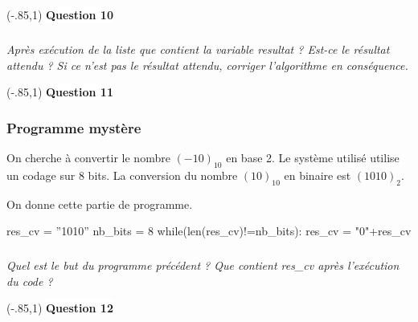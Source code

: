 \documentclass[10pt]{article}
\begin{document}
\vspace{.3cm}
\noindent\boxput*(-.85,1){
\colorbox{white}{\textbf{Question 10}}}{
\setlength{\fboxsep}{10pt}
}


\newpage

\subparagraph{}\textit{Après exécution de la liste que contient la variable \textsf{resultat} ?
 Est-ce le résultat attendu ? Si ce n'est pas le résultat attendu, corriger l'algorithme en conséquence.} 
 
 
\vspace{.3cm}
\noindent\boxput*(-.85,1){
\colorbox{white}{\textbf{Question 11}}}{
\setlength{\fboxsep}{10pt}
}


\subsubsection{Programme mystère}
On cherche à convertir le nombre $(-10)_{10}$ en base 2. Le système utilisé utilise un codage sur 8 bits. La conversion du nombre $(10)_{10}$ en binaire est $(1010)_{2}$.

On donne cette partie de programme. 
\begin{py}
\begin{minipage}[c]{.75\linewidth}
\begin{python}
res_cv = ''1010''
nb_bits = 8
while(len(res_cv)!=nb_bits):
    res_cv = "0"+res_cv
\end{python}
\end{minipage}
\end{py}

\subparagraph{}
\textit{Quel est le but du programme précédent ? Que contient \textsf{res\_cv} après l'exécution du code ?}

\vspace{.3cm}
\noindent\boxput*(-.85,1){
\colorbox{white}{\textbf{Question 12}}}{
\setlength{\fboxsep}{10pt}
}
\end{document}
